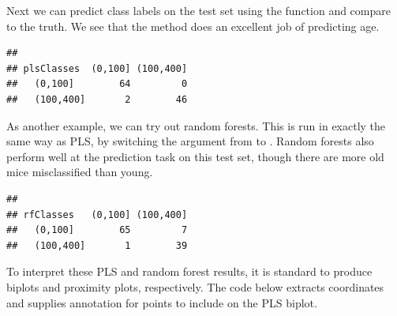Next we can predict class labels on the test set using the
 function and compare to the truth. We see that the
method does an excellent job of predicting age.
\begin{knitrout}
\color{fgcolor}\begin{kframe}
\begin{alltt}
 \hlkwb{<-}   
\hlopt{$}
\end{alltt}
\begin{verbatim}
##            
## plsClasses  (0,100] (100,400]
##   (0,100]        64         0
##   (100,400]       2        46
\end{verbatim}
\end{kframe}
\end{knitrout}

As another example, we can try out random forests. This is run in
exactly the same way as PLS, by switching the 
argument from  to . Random forests also
perform well at the prediction task  on this test set, though there
are more old mice misclassified than young.
\begin{knitrout}
\color{fgcolor}\begin{kframe}
\begin{alltt}
 \hlkwb{<-}  \hlopt{~}     \hlstd{=} \hlstd{,}
                \hlstd{=} \hlstd{,}  \hlstd{=} \hlstd{)}
 \hlkwb{<-}   
\hlopt{$}
\end{alltt}
\begin{verbatim}
##            
## rfClasses   (0,100] (100,400]
##   (0,100]        65         7
##   (100,400]       1        39
\end{verbatim}
\end{kframe}
\end{knitrout}

To interpret these PLS and random forest results, it is standard to
produce biplots and proximity plots, respectively. The code below
extracts coordinates and supplies annotation for points to include on
the PLS biplot.

